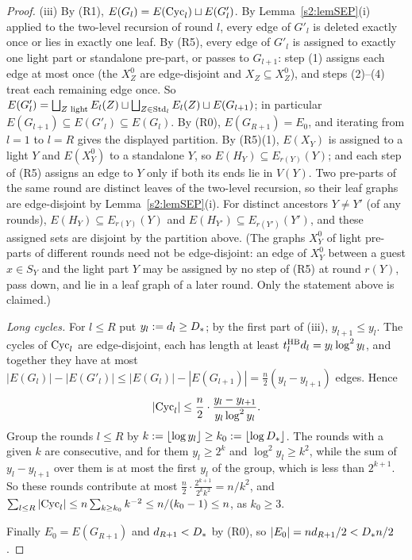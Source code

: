 \begin{proof}
(iii) By (R1), $E(G_l)=E(\mathrm{Cyc}_l)\sqcup E(G'_l)$. By Lemma~\ref{s2:lemSEP}(i)
applied to the two-level recursion of round $l$, every edge of $G'_l$ is
deleted exactly once or lies in exactly one leaf. By (R5), every edge of $G'_l$
is assigned to exactly one light part or standalone pre-part, or passes to
$G_{l+1}$: step (1) assigns each edge at most once (the $X^0_Z$ are
edge-disjoint and $X_Z\subseteq X^0_Z$), and steps (2)--(4) treat each
remaining edge once. So $E(G'_l)=\bigsqcup_{Z\text{ light}}E_l(Z)\sqcup
\bigsqcup_{Z\in\mathrm{Std}_l}E_l(Z)\sqcup E(G_{l+1})$; in particular
$E(G_{l+1})\subseteq E(G'_l)\subseteq E(G_l)$. By (R0), $E(G_{R+1})=E_0$, and
iterating from $l=1$ to $l=R$ gives the displayed partition. By (R5)(1),
$E(X_Y)$ is assigned to a light $Y$ and $E(X^0_Y)$ to a standalone $Y$, so
$E(H_Y)\subseteq E_{r(Y)}(Y)$; and each step of (R5) assigns an edge to $Y$
only if both its ends lie in $V(Y)$. Two pre-parts of the same round are
distinct leaves of the two-level recursion, so their leaf graphs are
edge-disjoint by Lemma~\ref{s2:lemSEP}(i). For distinct ancestors $Y\ne Y'$ (of
any rounds), $E(H_Y)\subseteq E_{r(Y)}(Y)$ and $E(H_{Y'})\subseteq
E_{r(Y')}(Y')$, and these assigned sets are disjoint by the partition above.
(The graphs $X^0_Y$ of light pre-parts of different rounds need not be
edge-disjoint: an edge of $X^0_Y$ between a guest $x\in S_Y$ and the light part
$Y$ may be assigned by no step of (R5) at round $r(Y)$, pass down, and lie in a
leaf graph of a later round. Only the statement above is claimed.)

\emph{Long cycles.} For $l\le R$ put $y_l\mathrel{:=} d_l\ge D_{*}$; by the first part
of (iii), $y_{l+1}\le y_l$. The cycles of $\mathrm{Cyc}_l$ are edge-disjoint, each has
length at least $t^{\mathrm{HB}}_ld_l=y_l\log^2y_l$, and together they have at most
$|E(G_l)|-|E(G'_l)|\le|E(G_l)|-|E(G_{l+1})|=\frac n2(y_l-y_{l+1})$ edges. Hence
\[
|\mathrm{Cyc}_l|\le\frac n2\cdot\frac{y_l-y_{l+1}}{y_l\log^2y_l}.
\]
Group the rounds $l\le R$ by $k\mathrel{:=}\lfloor\log y_l\rfloor\ge k_0\mathrel{:=}
\lfloor\log D_{*}\rfloor$. The rounds with a given $k$ are consecutive, and for
them $y_l\ge2^k$ and $\log^2y_l\ge k^2$, while the sum of $y_l-y_{l+1}$ over
them is at most the first $y_l$ of the group, which is less than $2^{k+1}$. So
these rounds contribute at most $\frac n2\cdot\frac{2^{k+1}}{2^kk^2}=n/k^2$,
and $\sum_{l\le R}|\mathrm{Cyc}_l|\le n\sum_{k\ge k_0}k^{-2}\le n/(k_0-1)\le n$, as
$k_0\ge3$.

Finally $E_0=E(G_{R+1})$ and $d_{R+1}<D_{*}$ by (R0), so
$|E_0|=nd_{R+1}/2<D_{*} n/2$.
\end{proof}

